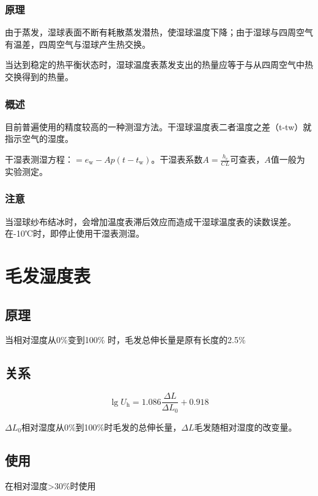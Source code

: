 \documentclass[UTF8,11pt]{ctexbook}
\begin{document}
\subsubsection{原理}

由于蒸发，湿球表面不断有耗散蒸发潜热，使湿球温度下降；由于湿球与四周空气有温差，四周空气与湿球产生热交换。

当达到稳定的热平衡状态时，湿球温度表蒸发支出的热量应等于与从四周空气中热交换得到的热量。

\subsubsection{概述}

目前普遍使用的精度较高的一种测湿方法。干湿球温度表二者温度之差（t-tw）就指示空气的湿度。

干湿表测湿方程：\(=e_{\mathrm{w}}-Ap(t-t_\mathrm{w})\)。干湿表系数\(A=\frac{h_\mathrm{c}}{CL}\)可查表，\(A\)值一般为实验测定。

\subsubsection{注意}

当湿球纱布结冰时，会增加温度表滞后效应而造成干湿球温度表的读数误差。在-10℃时，即停止使用干湿表测湿。

\section{毛发湿度表}

\subsection{原理}

当相对湿度从0\%变到100\% 时，毛发总伸长量是原有长度的2.5\%

\subsection{关系}
\[
\lg U_\mathrm{h}=1.086\frac{\Delta L}{\Delta L_0}+0.918
\]

\(\Delta L_0\)相对湿度从0\%到100\%时毛发的总伸长量，\(\Delta L\)毛发随相对湿度的改变量。

\subsection{使用}

在相对湿度>30\%时使用
\end{document}
